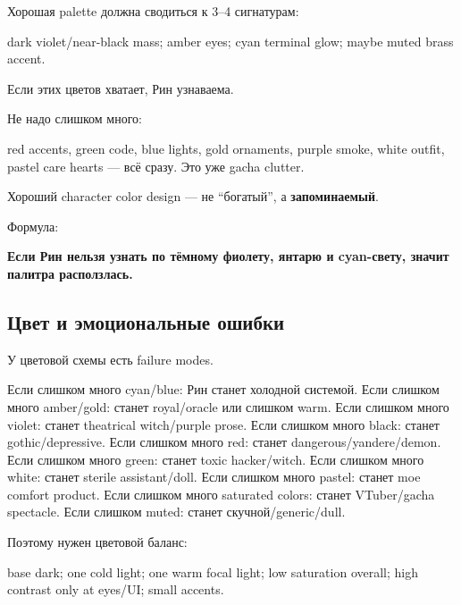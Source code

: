 Хорошая palette должна сводиться к 3--4 сигнатурам:

dark violet/\hspace{0pt}near-black mass; amber eyes; cyan terminal glow; maybe muted
brass accent.

Если этих цветов хватает, Рин узнаваема.

Не надо слишком много:

red accents, green code, blue lights, gold ornaments, purple smoke,
white outfit, pastel care hearts --- всё сразу. Это уже gacha clutter.

Хороший character color design --- не ``богатый'', а
\textbf{запоминаемый}.

Формула:

\textbf{Если Рин нельзя узнать по тёмному фиолету, янтарю и cyan-свету,
значит палитра расползлась.}

\subsection*{Цвет и эмоциональные ошибки}

У цветовой схемы есть failure modes.

Если слишком много cyan/\hspace{0pt}blue: Рин станет холодной системой. Если слишком
много amber/\hspace{0pt}gold: станет royal/\hspace{0pt}oracle или слишком warm. Если слишком
много violet: станет theatrical witch/\hspace{0pt}purple prose. Если слишком много
black: станет gothic/\hspace{0pt}depressive. Если слишком много red: станет
dangerous/\hspace{0pt}yandere/\hspace{0pt}demon. Если слишком много green: станет toxic
hacker/\hspace{0pt}witch. Если слишком много white: станет sterile assistant/\hspace{0pt}doll.
Если слишком много pastel: станет moe comfort product. Если слишком
много saturated colors: станет VTuber/\hspace{0pt}gacha spectacle. Если слишком
muted: станет скучной/\hspace{0pt}generic/\hspace{0pt}dull.

Поэтому нужен цветовой баланс:

base dark; one cold light; one warm focal light; low saturation overall;
high contrast only at eyes/\hspace{0pt}UI; small accents.


